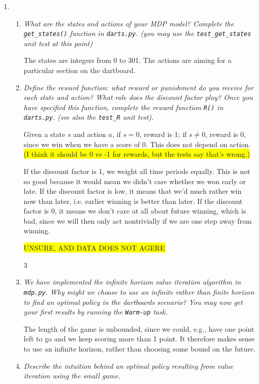\documentclass{article}
\newcommand{\edit}[1]{\colorbox{Yellow}{#1}}
\begin{document}
\begin{enumerate}
\item
  \begin{enumerate}
  \item \emph{What are the states and actions of your MDP model?
    Complete the \texttt{get\_states()} function in
    \texttt{darts.py}. (you may use the \texttt{test\_get\_states}
    unit test at this point)}

    The states are integers from 0 to 301. The actions are aiming for
    a particular section on the dartboard.

  \item \emph{Define the reward function: what reward or punishment do
    you receive for each state and action? What role does the discount
    factor play? Once you have specified this function, complete the
    reward function \texttt{R()} in \texttt{darts.py}. (see also the
    \texttt{test\_R} unit test).}

    Given a state $s$ and action $a$, if $s=0$, reward is 1; if $s\neq
    0$, reward is 0, since we win when we have a score of 0. This does
    not depend on action.  \edit{(I think it should be 0 vs -1 for
      rewards, but the tests say that's wrong.)}

    If the discount factor is 1, we weight all time periods
    equally. This is not so good because it would mean we didn't care
    whether we won early or late. If the discount factor is low, it
    means that we'd much rather win now than later, i.e. earlier
    winning is better than later. If the discount factor is 0, it
    means we don't care at all about future winning, which is bad,
    since we will then only act nontrivially if we are one step away
    from winning.

    \edit{UNSURE, AND DATA DOES NOT AGERE}

    \setcounter{enumii}3
  \item \emph{We have implemented the infinite horizon value iteration
    algorithm in \texttt{mdp.py}. Why might we choose to use an
    infinite rather than finite horizon to find an optimal policy in
    the dartboards scenario?  You may now get your first results by
    running the \texttt{Warm-up} task.}

    The length of the game is unbounded, since we could, e.g., have
    one point left to go and we keep scoring more than 1 point. It
    therefore makes sense to use an infinite horizon, rather than
    choosing some bound on the future.
    
  \item \emph{Describe the intuition behind an optimal policy
    resulting from value iteration using the small game.}


\end{enumerate}
\end{enumerate}
\end{document}
